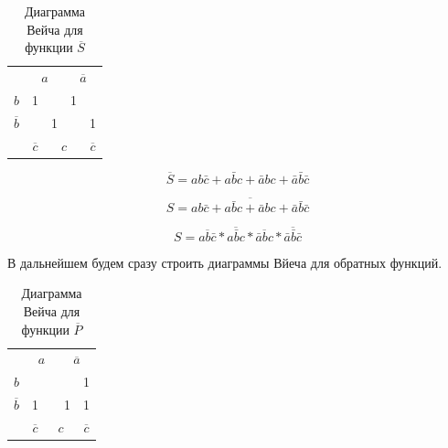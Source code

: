 \documentclass[a4paper,14pt]{article}
\begin{document}
\begin{table}[H]
	\begin{center}
		\caption{\label{tab:NSDvSum} Диаграмма Вейча для функции $\overline{S}$}
		\begin{tabular}{ccccc}
			& \multicolumn{2}{c}{$a$}                           & \multicolumn{2}{c}{$\overline{a}$}                          \\ \cline{2-5} 
			\multicolumn{1}{c|}{$b$}  & \multicolumn{1}{c|}{1}  & \multicolumn{1}{c|}{} & \multicolumn{1}{c|}{1}  & \multicolumn{1}{c|}{} \\ \cline{2-5} 
			\multicolumn{1}{c|}{$\overline{b}$} & \multicolumn{1}{c|}{} & \multicolumn{1}{c|}{1}  & \multicolumn{1}{c|}{} & \multicolumn{1}{c|}{1}  \\ \cline{2-5} 
			& $\overline{c}$      & \multicolumn{2}{c}{$c$}                          &$\overline{c}$                   
		\end{tabular}
	\end{center}
\end{table}

$$\overline{S} = ab\bar{c} + a\bar{b}c + \bar{a}bc + \bar{a}\bar{b}\bar{c}$$

$$S = \overline{ab\bar{c} + a\bar{b}c + \bar{a}bc + \bar{a}\bar{b}\bar{c}}$$

$$S = \overline{ab\bar{c}} * \overline{a\bar{b}c} * \overline{\bar{a}bc} * \overline{\bar{a}\bar{b}\bar{c}}$$

 В дальнейшем будем сразу строить диаграммы Вйеча для обратных функций.
 
 \begin{table}[H]
 	\begin{center}
 		\caption{\label{tab:NPDvSum} Диаграмма Вейча для функции $\overline{P}$}
 		\begin{tabular}{ccccc}
 			& \multicolumn{2}{c}{$a$}                           & \multicolumn{2}{c}{$\overline{a}$}                          \\ \cline{2-5} 
 			\multicolumn{1}{c|}{$b$}  & \multicolumn{1}{c|}{}  & \multicolumn{1}{c|}{} & \multicolumn{1}{c|}{}  & \multicolumn{1}{c|}{1} \\ \cline{2-5} 
 			\multicolumn{1}{c|}{$\overline{b}$} & \multicolumn{1}{c|}{1} & \multicolumn{1}{c|}{}  & \multicolumn{1}{c|}{1} & \multicolumn{1}{c|}{1}  \\ \cline{2-5} 
 			& $\overline{c}$                   & \multicolumn{2}{c}{$c$}                          & $\overline{c}$               
 		\end{tabular}
 	\end{center}
 \end{table}
\end{document}
